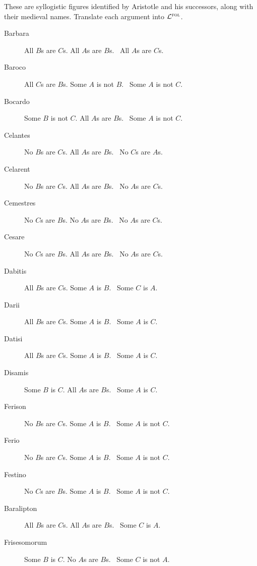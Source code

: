 \problempart
\label{pr.BarbaraEtc}
These are syllogistic figures identified by Aristotle and his successors, along with their medieval names. Translate each argument into $\mathcal{L}^{\textsc{fol}}$.
\begin{description}
\item[Barbara] All $B$s are $C$s. All $A$s are $B$s.
	\therefore\  All $A$s are $C$s.
\item[Baroco] All $C$s are $B$s. Some $A$ is not $B$.
	\therefore\  Some $A$ is not $C$.
\item[Bocardo] Some $B$ is not $C$. All $A$s are $B$s.
	\therefore\  Some $A$ is not $C$.
\item[Celantes] No $B$s are $C$s. All $A$s are $B$s.
	\therefore\  No $C$s are $A$s.
\item[Celarent] No $B$s are $C$s. All $A$s are $B$s.
	\therefore\  No $A$s are $C$s.
\item[Cemestres] No $C$s are $B$s. No $A$s are $B$s.
	\therefore\  No $A$s are $C$s.
\item[Cesare] No $C$s are $B$s. All $A$s are $B$s.
	\therefore\  No $A$s are $C$s.
\item[Dabitis] All $B$s are $C$s. Some $A$ is $B$.
	\therefore\  Some $C$ is $A$.
\item[Darii] All $B$s are $C$s. Some $A$ is $B$.
	\therefore\  Some $A$ is $C$.
\item[Datisi] All $B$s are $C$s. Some $A$ is $B$.
	\therefore\  Some $A$ is $C$.
\item[Disamis] Some $B$ is $C$. All $A$s are $B$s.
	\therefore\  Some $A$ is $C$.
\item[Ferison] No $B$s are $C$s. Some $A$ is $B$.
	\therefore\  Some $A$ is not $C$.
\item[Ferio] No $B$s are $C$s. Some $A$ is $B$.
	\therefore\  Some $A$ is not $C$.
\item[Festino] No $C$s are $B$s. Some $A$ is $B$.
	\therefore\  Some $A$ is not $C$.
\item[Baralipton] All $B$s are $C$s. All $A$s are $B$s.
	\therefore\  Some $C$ is $A$.
\item[Frisesomorum] Some $B$ is $C$. No $A$s are $B$s.
	\therefore\  Some $C$ is not $A$.
\end{description}


